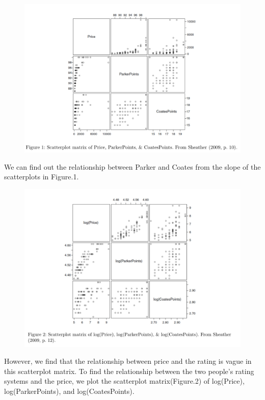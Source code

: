 \documentclass[11pt]{article}
\begin{document}
\begin{figure}[h]
    \centering
    \includegraphics[width=15cm]{Fig01.jpg}
    \label{fig:galaxy}
\end{figure}
We can find out the relationship between Parker and Coates from the slope of the scatterplots in Figure.1.
\begin{figure}[h]
    \centering
    \includegraphics[width=15cm]{Fig02.jpg}
    \label{fig:galaxy}
\end{figure}
However, we find that the relationship between price and the rating is vague in this scatterplot matrix. To find the relationship between the two people's rating systems and the price, we plot the scatterplot matrix(Figure.2) of log(Price), log(ParkerPoints), and log(CoatesPoints).\\\\
\end{document}
